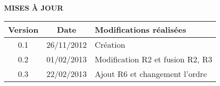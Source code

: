 \documentclass[a4paper,11pt,french]{article}
\begin{document}
\makeFirstPage
\clearpage
\vspace*{1cm}
\begin{center}
\textbf{\huge{MISES À JOUR}}\\
\vspace*{3cm}
	\begin{tabularx}{16cm}{|c|c|X|}
    \hline
	\bfseries{Version} & \bfseries{Date} & \bfseries{Modifications réalisées}\\
	\hline
	0.1 & 26/11/2012 & Création\\
	\hline
	0.2 & 01/02/2013 & Modification R2 et fusion R2, R3\\
	\hline
	0.3 & 22/02/2013 & Ajout R6 et changement l'ordre\\
	\hline
	\end{tabularx}
\end{center}

\clearpage
\end{document}
